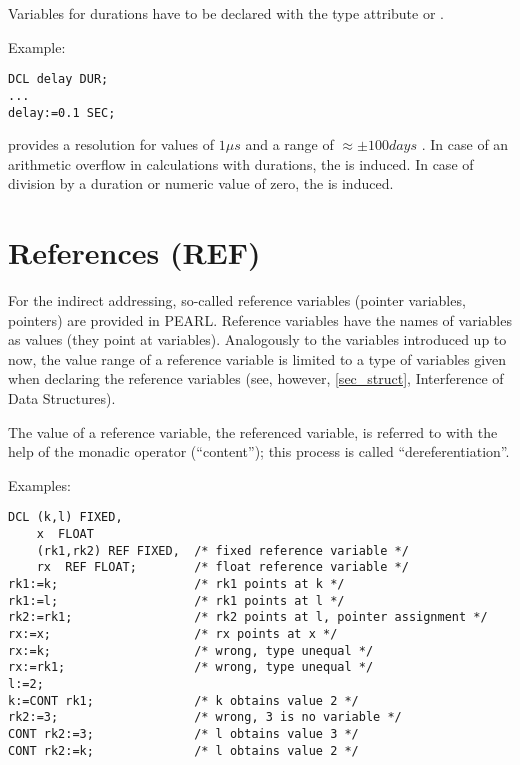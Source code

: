Variables for durations have to be declared with the type attribute
 or .

\begin{grammarframe}
\end{grammarframe}

Example:

\begin{lstlisting}
DCL delay DUR;
...
delay:=0.1 SEC;
\end{lstlisting}

\OpenPEARL{} provides a resolution for  values of $1\mu s$ 
and
a range of $\approx \pm 100 days$ .
In case of an arithmetic overflow in calculations with durations, the
 is induced.
In case of division by a duration or numeric value of zero, 
the  is induced.

\section{References (REF)}  %
\label{sec_references}

For the indirect addressing, so-called reference variables (pointer
variables, pointers) are provided in PEARL. Reference variables have the
names of variables as values (they point at variables). Analogously to
the variables introduced up to now, the value range of a reference
variable is limited to a type of variables given when declaring the
reference variables (see, however, \ref{sec_struct}, Interference of Data
Structures).

The value of a reference variable, the referenced variable, is referred
to with the help of the monadic operator  (``content''); this
process is called ``dereferentiation''.

Examples:

\begin{lstlisting}
DCL (k,l) FIXED,
    x  FLOAT
    (rk1,rk2) REF FIXED,  /* fixed reference variable */ 
    rx  REF FLOAT;        /* float reference variable */ 
rk1:=k;                   /* rk1 points at k */ 
rk1:=l;                   /* rk1 points at l */
rk2:=rk1;                 /* rk2 points at l, pointer assignment */
rx:=x;                    /* rx points at x */ 
rx:=k;                    /* wrong, type unequal */ 
rx:=rk1;                  /* wrong, type unequal */
l:=2;      
k:=CONT rk1;              /* k obtains value 2 */
rk2:=3;                   /* wrong, 3 is no variable */ 
CONT rk2:=3;              /* l obtains value 3 */ 
CONT rk2:=k;              /* l obtains value 2 */ 
\end{lstlisting}


